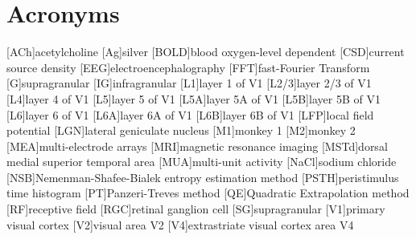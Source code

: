     \chapter*{Acronyms}
    \begin{acronym}[BOLD]
        [ACh]{acetylcholine}
        [Ag]{silver}
        [BOLD]{blood oxygen-level dependent}
        [CSD]{current source density}
        [EEG]{electroencephalography}
        [FFT]{fast-Fourier Transform}
        [G]{supragranular}
        [IG]{infragranular}
        [L1]{layer 1 of \ac{V1}}
        [L2/3]{layer 2/3 of \ac{V1}}
        [L4]{layer 4 of \ac{V1}}
        [L5]{layer 5 of \ac{V1}}
        [L5A]{layer 5A of \ac{V1}}
        [L5B]{layer 5B of \ac{V1}}
        [L6]{layer 6 of \ac{V1}}
        [L6A]{layer 6A of \ac{V1}}
        [L6B]{layer 6B of \ac{V1}}
        [LFP]{local field potential}
        [LGN]{lateral geniculate nucleus}
        [M1]{monkey 1}
        [M2]{monkey 2}
        [MEA]{multi-electrode arrays}
        [MRI]{magnetic resonance imaging}
        [MSTd]{dorsal medial superior temporal area}
        [MUA]{multi-unit activity}
        [NaCl]{sodium chloride}
        [NSB]{{N}emenman-{S}hafee-{B}ialek entropy estimation method}
        [PSTH]{peristimulus time histogram}
        [PT]{{P}anzeri-{T}reves method}
        [QE]{Quadratic Extrapolation method}
        [RF]{receptive field}
        [RGC]{retinal ganglion cell}
        [SG]{supragranular}
        [V1]{primary visual cortex}
        [V2]{visual area {V2}}
        [V4]{extrastriate visual cortex area {V4}}
    \end{acronym}                     
\endgroup

\cleardoublepage
